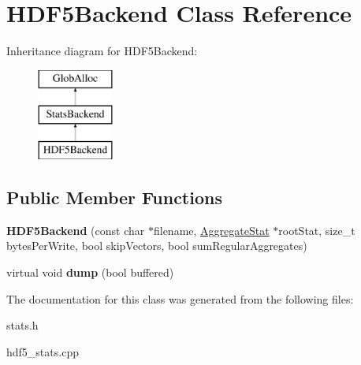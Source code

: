 \hypertarget{classHDF5Backend}{\section{H\-D\-F5\-Backend Class Reference}
\label{classHDF5Backend}
}
Inheritance diagram for H\-D\-F5\-Backend\-:\begin{figure}[H]
\begin{center}
\leavevmode
\includegraphics[height=3.000000cm]{classHDF5Backend}
\end{center}
\end{figure}
\subsection*{Public Member Functions}
\begin{DoxyCompactItemize}
\item 
\hypertarget{classHDF5Backend_ac12e84e1c4cc5ce59b9fe94192587fdd}{{\bfseries H\-D\-F5\-Backend} (const char $\ast$filename, \hyperlink{classAggregateStat}{Aggregate\-Stat} $\ast$root\-Stat, size\-\_\-t bytes\-Per\-Write, bool skip\-Vectors, bool sum\-Regular\-Aggregates)}\label{classHDF5Backend_ac12e84e1c4cc5ce59b9fe94192587fdd}

\item 
\hypertarget{classHDF5Backend_aa30ec81d35765cc8abbf2f1653070e25}{virtual void {\bfseries dump} (bool buffered)}\label{classHDF5Backend_aa30ec81d35765cc8abbf2f1653070e25}

\end{DoxyCompactItemize}


The documentation for this class was generated from the following files\-:\begin{DoxyCompactItemize}
\item 
stats.\-h\item 
hdf5\-\_\-stats.\-cpp\end{DoxyCompactItemize}
